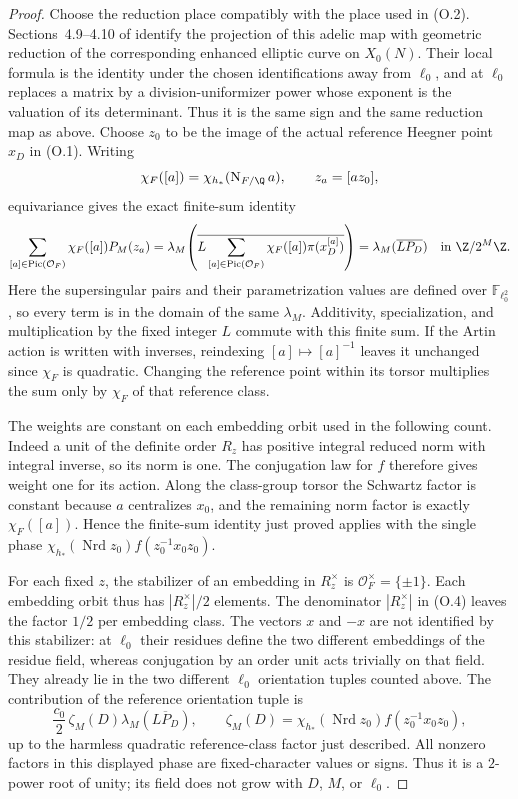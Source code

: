 \begin{proof}
Choose the reduction place compatibly with the place used in (O.2).
Sections~4.9--4.10 of \cite{cornutjetchev} identify the projection
of this adelic map with geometric reduction of the corresponding
enhanced elliptic curve on $X_0(N)$. Their local formula is the
identity under the chosen identifications away from $\ell_0$, and
at $\ell_0$ replaces a matrix by a division-uniformizer power
whose exponent is the valuation of its determinant. Thus it is
the same sign and the same reduction map as above. Choose $z_0$
to be the image of the actual reference Heegner point $x_D$ in
(O.1). Writing
\[
 \chi_F([a])=\chi_{h_*}(\operatorname{N}_{F/\Q}a),\qquad
 z_a=[az_0],
\]
equivariance gives the exact finite-sum identity
\[
 \sum_{[a]\in\operatorname{Pic}(\mathcal O_F)}
       \chi_F([a])P_M(z_a)
 =\lambda_M\!\left(
       \overline{L\sum_{[a]\in\operatorname{Pic}(\mathcal O_F)}
                         \chi_F([a])\pi(x_D^{[a]})}\right)
 =\lambda_M(\overline{LP_D})\quad\text{in }\Z/2^M\Z.
\]
Here the supersingular pairs and their parametrization values are
defined over $\mathbb F_{\ell_0^2}$, so every term is in the domain
of the same $\lambda_M$. Additivity, specialization, and multiplication
by the fixed integer $L$ commute with this finite sum. If the Artin
action is written with inverses, reindexing $[a]\mapsto[a]^{-1}$
leaves it unchanged since $\chi_F$ is quadratic. Changing the
reference point within its torsor multiplies the sum only by
$\chi_F$ of that reference class.

The weights are constant on each embedding orbit used in the
following count. Indeed a unit of the definite order $R_z$ has
positive integral reduced norm with integral inverse, so its norm
is one. The conjugation law for $f$ therefore gives weight one
for its action. Along the class-group torsor the Schwartz factor
is constant because $a$ centralizes $x_0$, and the remaining
norm factor is exactly $\chi_F([a])$. Hence the finite-sum identity
just proved applies with the single phase
$\chi_{h_*}(\operatorname{Nrd}z_0)f(z_0^{-1}x_0z_0)$.


For each fixed $z$, the stabilizer of an embedding in $R_z^\times$
is $\mathcal O_F^\times=\{\pm1\}$. Each embedding orbit thus
has $|R_z^\times|/2$ elements. The denominator $|R_z^\times|$
in (O.4) leaves the factor $1/2$ per embedding class. The
vectors $x$ and $-x$ are not identified by this stabilizer:
at $\ell_0$ their residues define the two different embeddings
of the residue field, whereas conjugation by an order unit acts
trivially on that field. They already lie in the two different
$\ell_0$ orientation tuples counted above. The
contribution of the reference orientation tuple is
\[
 \frac{c_0}{2}\,\zeta_M(D)
                         \lambda_M(\overline{LP_D}),\qquad
 \zeta_M(D)=\chi_{h_*}(\operatorname{Nrd}z_0)
                               f(z_0^{-1}x_0z_0),
\]
up to the harmless quadratic reference-class factor just described.
All nonzero factors in this displayed phase are fixed-character
values or signs. Thus it is a $2$-power root of unity; its field
does not grow with $D$, $M$, or $\ell_0$.


\end{proof}
